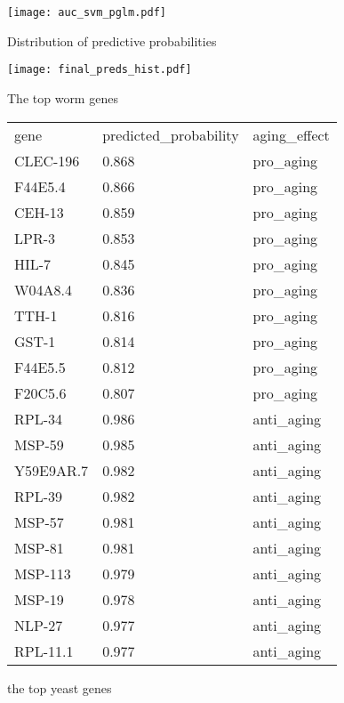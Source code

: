 \documentclass{article}
\begin{document}
\texttt{[image: auc\_svm\_pglm.pdf]}

Distribution of predictive probabilities

\texttt{[image: final\_preds\_hist.pdf]}

The top worm genes

\begin{table}[ht]
\begin{tabular}{lll}
gene      & predicted\_probability & aging\_effect \\
CLEC-196  & 0.868                  & pro\_aging    \\
F44E5.4   & 0.866                  & pro\_aging    \\
CEH-13    & 0.859                  & pro\_aging    \\
LPR-3     & 0.853                  & pro\_aging    \\
HIL-7     & 0.845                  & pro\_aging    \\
W04A8.4   & 0.836                  & pro\_aging    \\
TTH-1     & 0.816                  & pro\_aging    \\
GST-1     & 0.814                  & pro\_aging    \\
F44E5.5   & 0.812                  & pro\_aging    \\
F20C5.6   & 0.807                  & pro\_aging    \\
RPL-34    & 0.986                  & anti\_aging   \\
MSP-59    & 0.985                  & anti\_aging   \\
Y59E9AR.7 & 0.982                  & anti\_aging   \\
RPL-39    & 0.982                  & anti\_aging   \\
MSP-57    & 0.981                  & anti\_aging   \\
MSP-81    & 0.981                  & anti\_aging   \\
MSP-113   & 0.979                  & anti\_aging   \\
MSP-19    & 0.978                  & anti\_aging   \\
NLP-27    & 0.977                  & anti\_aging   \\
RPL-11.1  & 0.977                  & anti\_aging
\end{tabular}
\end{table}

\newpage

the top yeast genes
\end{document}
